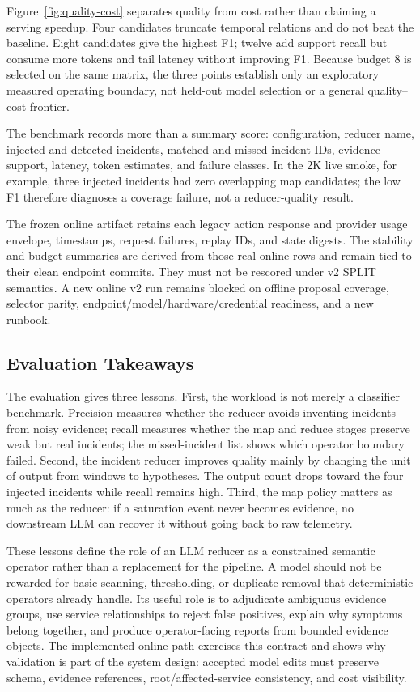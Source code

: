 \documentclass[sigplan,anonymous,nonacm]{acmart}
\begin{document}
Figure~\ref{fig:quality-cost} separates quality from cost rather than claiming a serving speedup. Four candidates truncate temporal relations and do not beat the baseline. Eight candidates give the highest F1; twelve add support recall but consume more tokens and tail latency without improving F1. Because budget 8 is selected on the same matrix, the three points establish only an exploratory measured operating boundary, not held-out model selection or a general quality--cost frontier.

The benchmark records more than a summary score: configuration, reducer name, injected and detected incidents, matched and missed incident IDs, evidence support, latency, token estimates, and failure classes. In the 2K live smoke, for example, three injected incidents had zero overlapping map candidates; the low F1 therefore diagnoses a coverage failure, not a reducer-quality result.

The frozen online artifact retains each legacy action response and provider usage envelope, timestamps, request failures, replay IDs, and state digests. The stability and budget summaries are derived from those real-online rows and remain tied to their clean endpoint commits. They must not be rescored under v2 SPLIT semantics. A new online v2 run remains blocked on offline proposal coverage, selector parity, endpoint/model/hardware/credential readiness, and a new runbook.

\subsection{Evaluation Takeaways}

The evaluation gives three lessons. First, the workload is not merely a classifier benchmark. Precision measures whether the reducer avoids inventing incidents from noisy evidence; recall measures whether the map and reduce stages preserve weak but real incidents; the missed-incident list shows which operator boundary failed. Second, the incident reducer improves quality mainly by changing the unit of output from windows to hypotheses. The output count drops toward the four injected incidents while recall remains high. Third, the map policy matters as much as the reducer: if a saturation event never becomes evidence, no downstream LLM can recover it without going back to raw telemetry.

These lessons define the role of an LLM reducer as a constrained semantic operator rather than a replacement for the pipeline. A model should not be rewarded for basic scanning, thresholding, or duplicate removal that deterministic operators already handle. Its useful role is to adjudicate ambiguous evidence groups, use service relationships to reject false positives, explain why symptoms belong together, and produce operator-facing reports from bounded evidence objects. The implemented online path exercises this contract and shows why validation is part of the system design: accepted model edits must preserve schema, evidence references, root/affected-service consistency, and cost visibility.
\end{document}

